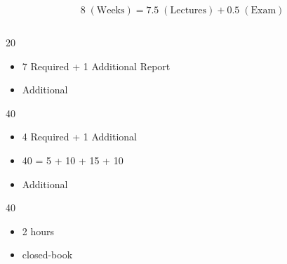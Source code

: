 
\begin{frame}{}
  \[
    8\; (\text{Weeks}) = 7.5\; (\text{Lectures}) + 0.5\; (\text{Exam})
  \]

\end{frame}

\begin{frame}{}
    \begin{columns}
        \begin{description}
            \setlength{\itemsep}{10pt}
            \item[HW:] 20 
              \begin{itemize}
                \item 7 Required + 1 Additional Report
                \item Additional 
              \end{itemize}
            \item[Labs:] 40 
              \begin{itemize}
                \item 4 Required + 1 Additional
                \item 40 = 5 + 10 + 15 + 10
                \item Additional 
              \end{itemize}
            \item[Exam:] 40
              \begin{itemize}
                \item 2 hours
                \item closed-book
              \end{itemize}
        \end{description}
    \end{columns}
\end{frame}
